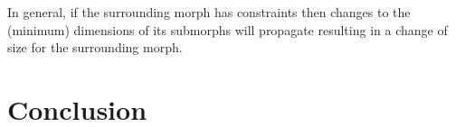 \documentclass[a4paper,10pt,twoside]{book}
\begin{document}
In general, if the surrounding morph has  constraints then changes to the (minimum) dimensions of its submorphs will propagate resulting in a change of size for the surrounding morph.



\section{Conclusion}

\ifx\wholebook\relax\else
   
   
\end{document}
